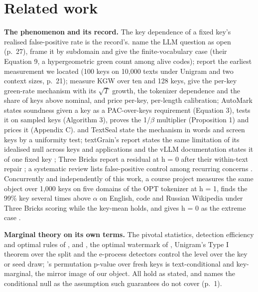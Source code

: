 \documentclass[11pt,letterpaper]{article}
\begin{document}
\hypertarget{related-work}{%
\section{Related work}\label{related-work}}

\textbf{The phenomenon and its record.} The key dependence of a fixed key's realised false-positive rate is the record's. \citet{jovanovic2025image} name the LLM question as open (p.~27), frame it by subdomain and give the finite-vocabulary case (their Equation 9, a hypergeometric green count among alive codes); \citet{gloaguen2026diffusion} report the earliest measurement we located (100 keys on 10,000 texts under Unigram and two context sizes, p.~21); \citet{genhatharan2026nominal} measure KGW over ten and 128 keys, give the per-key green-rate mechanism with its \ensuremath{\sqrt{T}} growth, the tokenizer dependence and the share of keys above nominal, and price per-key, per-length calibration; AutoMark \citep{gloaguen2026automark} states soundness given a key as a PAC-over-keys requirement (Equation 3), tests it on sampled keys (Algorithm 3), proves the 1/\ensuremath{\beta} multiplier (Proposition 1) and prices it (Appendix C). \citet{fernandez2026posthoc} and TextSeal \citep{sander2026textseal} state the mechanism in words and screen keys by a uniformity test; textGrain's report states the same limitation of its idealised null across keys and applications \citep[p.~6]{openai2026textgrain} and the vLLM documentation states it of one fixed key \citep{vllm2026watermarking}; Three Bricks report a residual at h = 0 after their within-text repair \citep{fernandez2023bricks}; a systematic review lists false-positive control among recurring concerns \citep{islam2026reliable}. Concurrently and independently of this work, a course project measures the same object over 1,000 keys on five domains of the OPT tokenizer at h = 1, finds the 99\% key several times above \ensuremath{\alpha} on English, code and Russian Wikipedia under Three Bricks scoring while the key-mean holds, and gives h = 0 as the extreme case \citep{yukhimchuk2026keylottery}.

\textbf{Marginal theory on its own terms.} The pivotal statistics, detection efficiency and optimal rules of \citet{li2025framework}, \citet{li2025robust} and \citet{cai2025collision}, the optimal watermark of \citet{huang2023optimal}, Unigram's Type I theorem over the split \citep{zhao2024unigram} and the e-process detectors \citep{su2026anytime, huang2026anytime, luo2026anytime, ding2026reference} control the level over the key or seed draw; \citet{kuditipudi2024distortion}'s permutation p-value over fresh keys is text-conditional and key-marginal, the mirror image of our object. All hold as stated, and \citet{ma2026predictive} names the conditional null as the assumption such guarantees do not cover (p.~1).
\end{document}
